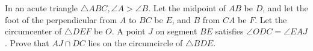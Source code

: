 In an acute triangle $\triangle ABC, \angle A > \angle B$. Let the midpoint of $AB$ be $D$, and let the foot of the perpendicular from $A$ to $BC$ be $E$, and $B$ from $CA$ be $F$. Let the circumcenter of $\triangle DEF$ be $O$. A point $J$ on segment $BE$  satisfies $\angle ODC = \angle EAJ$. Prove that $AJ \cap DC$ lies on the circumcircle of $\triangle BDE$.